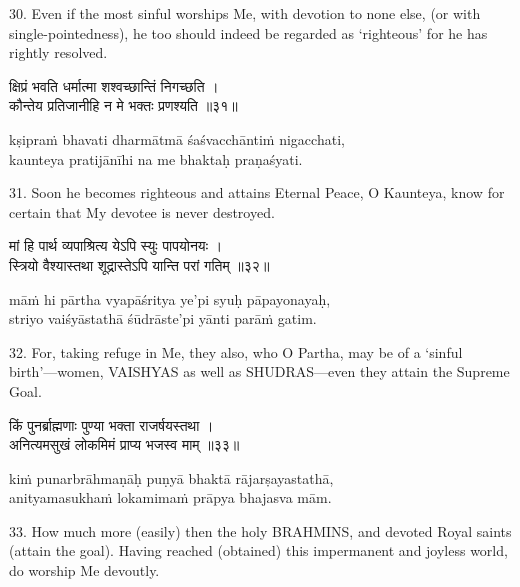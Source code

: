 30. Even if the most sinful worships Me, with devotion to none else, (or with
single-pointedness), he too should indeed be regarded as `righteous' for he has
rightly resolved.

\begin{gitaverse}
क्षिप्रं भवति धर्मात्मा शश्वच्छान्तिं निगच्छति । \\
कौन्तेय प्रतिजानीहि न मे भक्तः प्रणश्यति ॥३१॥
\end{gitaverse}

\begin{transliteration}
kṣipraṁ bhavati dharmātmā śaśvacchāntiṁ nigacchati, \\
kaunteya pratijānīhi na me bhaktaḥ praṇaśyati.
\end{transliteration}

31. Soon he becomes righteous and attains Eternal Peace, O Kaunteya, know for
certain that My devotee is never destroyed.

\begin{gitaverse}
मां हि पार्थ व्यपाश्रित्य येऽपि स्युः पापयोनयः । \\
स्त्रियो वैश्यास्तथा शूद्रास्तेऽपि यान्ति परां गतिम् ॥३२॥
\end{gitaverse}

\begin{transliteration}
māṁ hi pārtha vyapāśritya ye'pi syuḥ pāpayonayaḥ, \\
striyo vaiśyāstathā śūdrāste'pi yānti parāṁ gatim.
\end{transliteration}

32. For, taking refuge in Me, they also, who O Partha, may be of a `sinful
birth'---women, VAISHYAS as well as SHUDRAS---even they attain the Supreme
Goal.

\begin{gitaverse}
किं पुनर्ब्राह्मणाः पुण्या भक्ता राजर्षयस्तथा । \\
अनित्यमसुखं लोकमिमं प्राप्य भजस्व माम् ॥३३॥
\end{gitaverse}

\begin{transliteration}
kiṁ punarbrāhmaṇāḥ puṇyā bhaktā rājarṣayastathā, \\
anityamasukhaṁ lokamimaṁ prāpya bhajasva mām.
\end{transliteration}

33. How much more (easily) then the holy BRAHMINS, and devoted Royal saints
(attain the goal). Having reached (obtained) this impermanent and joyless
world, do worship Me devoutly.

